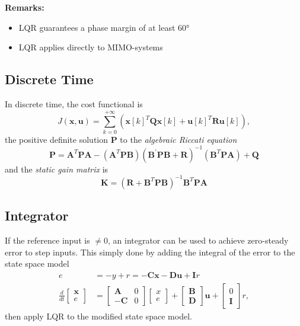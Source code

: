 \textbf{} 
\textbf{Remarks:}
\begin{itemize}
    \item LQR guarantees a phase margin of at least 60°
    \item LQR applies directly to MIMO-systems
\end{itemize}

\subsection{Discrete Time}
In discrete time, the cost functional is
\noindent\begin{equation*}
    J(\mathbf{x,u})=\sum_{k=0}^{+\infty}\left({\mathbf{x}[k]}^T \mathbf{Qx}[k]+{\mathbf{u}[k]}^T \mathbf{Ru}[k]\right),
\end{equation*}
the positive definite solution $\mathbf{P}$ to the \textit{algebraic Riccati equation}
\noindent\begin{equation*}
    \mathbf{P}=\mathbf{A}^T \mathbf{PA}-(\mathbf{A}^T \mathbf{PB}){(\mathbf{B}^{\prime}\mathbf{PB}+\mathbf{R})}^{-1}(\mathbf{B}^T \mathbf{PA})+\mathbf{Q}
\end{equation*}
and the \textit{static gain matrix} is
\noindent\begin{equation*}
    \mathbf{K}={(\mathbf{R}+\mathbf{B}^T \mathbf{PB})}^{-1}\mathbf{B}^T \mathbf{PA}
\end{equation*}

\textbf{} 

\subsection{Integrator}
If the reference input is $\neq 0$, an integrator can be used to achieve zero-steady error to step inputs.
This simply done by adding the integral of the error to the state space model
\noindent\begin{align*}
    e & =-y+r =  -\mathbf{Cx} - \mathbf{Du} + \mathbf{I}r \\
    \frac d{dt}
    \begin{bmatrix}
        \mathbf{x} \\
        e
    \end{bmatrix}
      & =\begin{bmatrix}
             \mathbf{A}  & 0 \\
             -\mathbf{C} & 0
         \end{bmatrix}
    \begin{bmatrix}x \\
        e
    \end{bmatrix}
    +\begin{bmatrix}
         \mathbf{B} \\
         \mathbf{D}
     \end{bmatrix}
    \mathbf{u}+
    \begin{bmatrix}
        0 \\
        \mathbf{I}
    \end{bmatrix}
    r,
\end{align*}
then apply LQR to the modified state space model.

